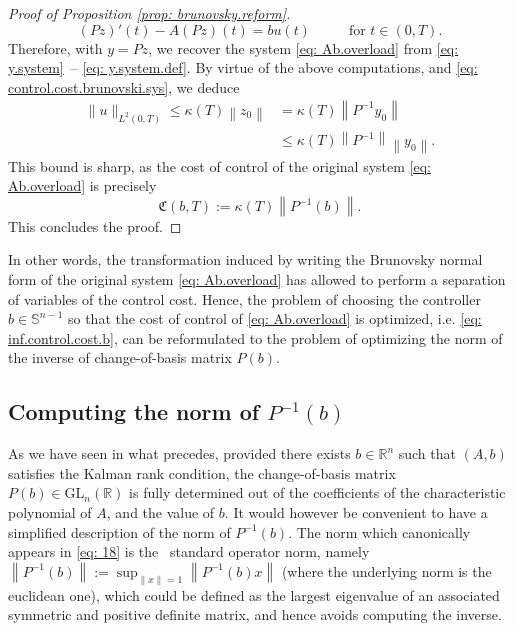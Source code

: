 \documentclass[journal,twoside,web]{ieeecolor}
\newcommand{\R}{\mathbb{R}}
\begin{document}
\begin{proof}[Proof of Proposition \ref{prop: brunovsky.reform}]
	\begin{equation}
	(P z)'(t) - A (Pz)(t)  = bu(t) \hspace{1cm} \text{ for } t\in(0,T).
	\end{equation}
	Therefore, with $y=Pz$, we recover the system \eqref{eq: Ab.overload} from \eqref{eq: y.system} -- \eqref{eq: y.system.def}.
	By virtue of the above computations, and \eqref{eq: control.cost.brunovski.sys}, we deduce
	\begin{align*}
	\|u\|_{L^2(0,T)} \leqslant \kappa(T) \left\|z_0\right\| &= \kappa(T) \left\|P^{-1}y_0\right\|\nonumber \\
	&\leqslant \kappa(T) \left\|P^{-1}\right\| \left\|y_0\right\|.
	\end{align*}
	This bound is sharp, as the cost of control of the original system \eqref{eq: Ab.overload} is precisely
	\begin{equation*}
	\mathfrak{C}(b,T) := \kappa(T) \left\|P^{-1}(b)\right\|.
	\end{equation*}
	This concludes the proof.
	\end{proof}
	\medskip
	
	\noindent
	In other words, the transformation induced by writing the Brunovsky normal form of the original system \eqref{eq: Ab.overload} has allowed to perform a separation of variables of the control cost. Hence, the problem of choosing the controller $b\in\mathbb{S}^{n-1}$ so that the cost of control of \eqref{eq: Ab.overload} is optimized, i.e. \eqref{eq: inf.control.cost.b}, can be reformulated to the problem of optimizing the norm of the inverse of change-of-basis matrix $P(b)$.
	
	\subsection{Computing the norm of $P^{-1}(b)$} 
	As we have seen in what precedes, provided there exists $b\in\R^n$ such that $(A,b)$ satisfies the Kalman rank condition, the change-of-basis matrix
	$
	P(b) \in \mathrm{GL}_n(\R)
	$
	is fully determined out of the coefficients of the characteristic polynomial of $A$, and the value of $b$.
	It would however be convenient to have a simplified description of the norm of $P^{-1}(b)$. 
	The norm which canonically appears in \eqref{eq: 18} is the  standard operator norm, namely $\left\|P^{-1}(b)\right\| := \sup_{\|x\|=1} \left\|P^{-1}(b)x\right\|$ (where the underlying norm is the euclidean one), which could be defined as the largest eigenvalue of an associated symmetric and positive definite matrix, and hence avoids computing the inverse.
	
\end{document}
